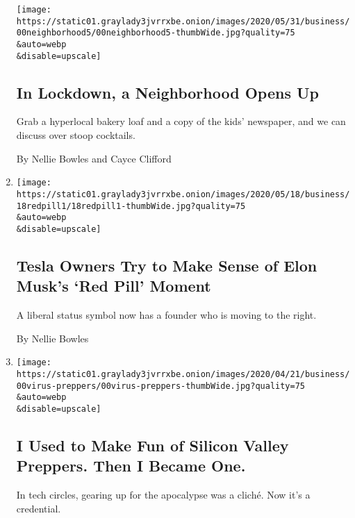 \begin{enumerate}
  \texttt{[image: https://static01.graylady3jvrrxbe.onion/images/2020/05/31/business/00neighborhood5/00neighborhood5-thumbWide.jpg?quality=75\\\&auto=webp\\\&disable=upscale]}

  \hypertarget{in-lockdown-a-neighborhood-opens-up}{%
  \subsection{In Lockdown, a Neighborhood Opens
  Up}\label{in-lockdown-a-neighborhood-opens-up}}

  Grab a hyperlocal bakery loaf and a copy of the kids' newspaper, and
  we can discuss over stoop cocktails.

  By Nellie Bowles and Cayce Clifford
\item
  \href{/2020/05/19/technology/elon-musk-tesla-red-pill.html}{}

  \texttt{[image: https://static01.graylady3jvrrxbe.onion/images/2020/05/18/business/18redpill1/18redpill1-thumbWide.jpg?quality=75\\\&auto=webp\\\&disable=upscale]}

  \hypertarget{tesla-owners-try-to-make-sense-of-elon-musks-red-pill-moment}{%
  \subsection{Tesla Owners Try to Make Sense of Elon Musk's `Red Pill'
  Moment}\label{tesla-owners-try-to-make-sense-of-elon-musks-red-pill-moment}}

  A liberal status symbol now has a founder who is moving to the right.

  By Nellie Bowles
\item
  \href{/2020/04/24/technology/coronavirus-preppers.html}{}

  \texttt{[image: https://static01.graylady3jvrrxbe.onion/images/2020/04/21/business/00virus-preppers/00virus-preppers-thumbWide.jpg?quality=75\\\&auto=webp\\\&disable=upscale]}

  \hypertarget{i-used-to-make-fun-of-silicon-valley-preppers-then-i-became-one}{%
  \subsection{I Used to Make Fun of Silicon Valley Preppers. Then I
  Became
  One.}\label{i-used-to-make-fun-of-silicon-valley-preppers-then-i-became-one}}

  In tech circles, gearing up for the apocalypse was a cliché. Now it's
  a credential.


\end{enumerate}
